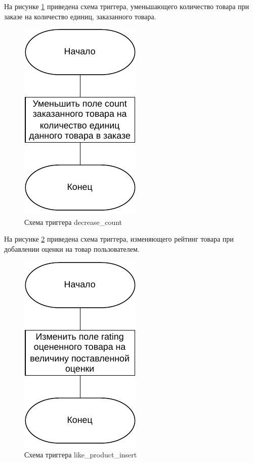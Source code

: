 На рисунке \ref{decrease_count_trigger} приведена схема триггера, уменьшающего количество товара при заказе на количество единиц, заказанного товара.

\newpage

\captionsetup{singlelinecheck = false, justification=centering}
\begin{figure}[h!]
	\begin{center}
		\includegraphics[scale=0.8]{assets/decrease_count_trigger.pdf}
	\end{center}
	\caption{Схема триггера decrease\_count}
	\label{decrease_count_trigger}
\end{figure}

На рисунке \ref{like_product_trigger} приведена схема триггера, изменяющего рейтинг товара при добавлении оценки на товар пользователем.

\captionsetup{singlelinecheck = false, justification=centering}
\begin{figure}[h!]
	\begin{center}
		\includegraphics[scale=0.8]{assets/like_product_trigger.pdf}
	\end{center}
	\caption{Схема триггера like\_product\_insert}
	\label{like_product_trigger}
\end{figure}

